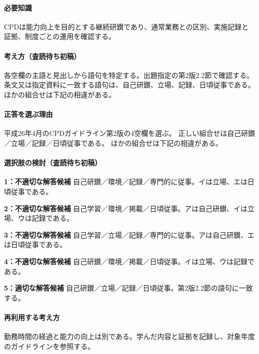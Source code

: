 \paragraph{必要知識} CPDは能力向上を目的とする継続研鑚であり、通常業務との区別、実施記録と証拠、制度ごとの運用を確認する。

\paragraph{考え方（査読待ち初稿）} 各空欄の主語と見出しから語句を特定する。出題指定の第2版2.2節で確認する。 条文又は指定資料に一致する語句は、自己研鑚、立場、記録、日頃従事である。ほかの組合せは下記の相違がある。

\paragraph{正答を選ぶ理由} 平成26年4月のCPDガイドライン第2版の4空欄を選ぶ。 正しい組合せは自己研鑚／立場／記録／日頃従事である。 ほかの組合せは下記の相違がある。

\paragraph{選択肢の検討（査読待ち初稿）}\mbox{}\par

\noindent\textbf{1：不適切な解答候補} 自己研鑚／環境／記録／専門的に従事。イは立場、エは日頃従事である。\par

\noindent\textbf{2：不適切な解答候補} 自己学習／環境／掲載／日頃従事。アは自己研鑚、イは立場、ウは記録である。\par

\noindent\textbf{3：不適切な解答候補} 自己学習／立場／記録／専門的に従事。アは自己研鑚、エは日頃従事である。\par

\noindent\textbf{4：不適切な解答候補} 自己研鑚／環境／掲載／日頃従事。イは立場、ウは記録である。\par

\noindent\textbf{5：適切な解答候補} 自己研鑚／立場／記録／日頃従事。第2版2.2節の語句に一致する。\par

\paragraph{再利用する考え方} 勤務時間の経過と能力の向上は別である。学んだ内容と証拠を記録し、対象年度のガイドラインを参照する。

